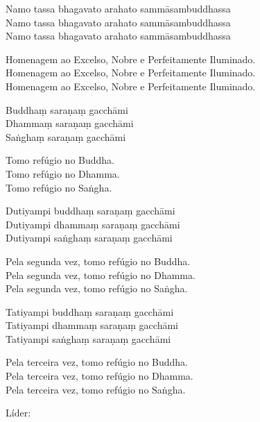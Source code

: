 Namo tassa bhagavato arahato sammāsambuddhassa\\
Namo tassa bhagavato arahato sammāsambuddhassa\\
Namo tassa bhagavato arahato sammāsambuddhassa

\begin{english}
  Homenagem ao Excelso, Nobre e Perfeitamente Iluminado.\\
  Homenagem ao Excelso, Nobre e Perfeitamente Iluminado.\\
  Homenagem ao Excelso, Nobre e Perfeitamente Iluminado.
\end{english}

Buddhaṃ saraṇaṃ gacchāmi\\
Dhammaṃ saraṇaṃ gacchāmi\\
Saṅghaṃ saraṇaṃ gacchāmi

\begin{english}
  Tomo refúgio no Buddha.\\
  Tomo refúgio no Dhamma.\\
  Tomo refúgio no Saṅgha.
\end{english}

Dutiyampi buddhaṃ saraṇaṃ gacchāmi\\
Dutiyampi dhammaṃ saraṇaṃ gacchāmi\\
Dutiyampi saṅghaṃ saraṇaṃ gacchāmi

\begin{english}
  Pela segunda vez, tomo refúgio no Buddha.\\
  Pela segunda vez, tomo refúgio no Dhamma.\\
  Pela segunda vez, tomo refúgio no Saṅgha.
\end{english}

Tatiyampi buddhaṃ saraṇaṃ gacchāmi\\
Tatiyampi dhammaṃ saraṇaṃ gacchāmi\\
Tatiyampi saṅghaṃ saraṇaṃ gacchāmi

\clearpage

\begin{english}
  Pela terceira vez, tomo refúgio no Buddha.\\
  Pela terceira vez, tomo refúgio no Dhamma.\\
  Pela terceira vez, tomo refúgio no Saṅgha.
\end{english}

\begin{instruction}
  Líder:
\end{instruction}

